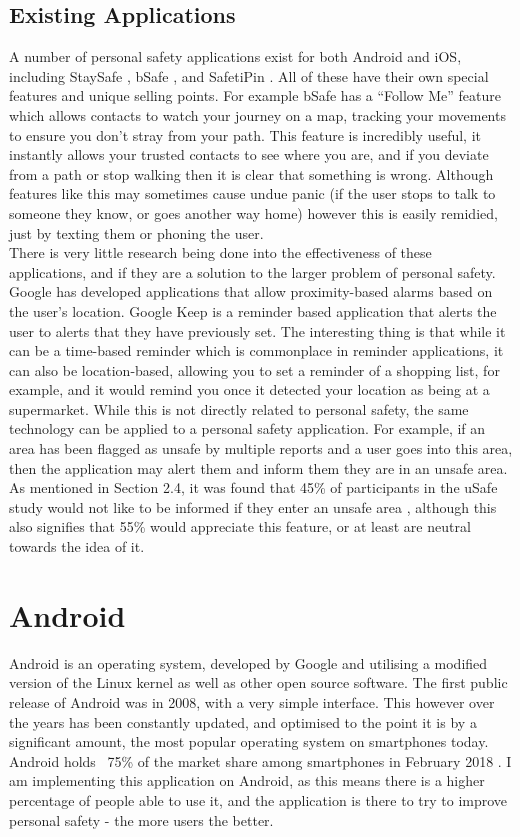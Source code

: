 \documentclass[a4paper]{report}
\begin{document}
 \subsection{Existing Applications} 
 \label{sec:ExistingApps}
 A number of personal safety applications exist for both Android and iOS, including StaySafe \cite{StaySafe}, bSafe \cite{bSafe}, and SafetiPin \cite{safetipin}. All of these have their own special features and unique selling points. For example
 bSafe has a ``Follow Me'' feature which allows contacts to watch your journey on a map, tracking your movements to ensure you don't stray from your path. This feature is incredibly useful, it instantly allows your trusted contacts to see
 where you are, and if you deviate from a path or stop walking then it is clear that something is wrong. Although features like this may sometimes cause undue panic (if the user stops to talk to someone they know, or goes another way home) however this
 is easily remidied, just by texting them or phoning the user. \\ There is very little research being done into the effectiveness of these applications, and if they are a solution to the larger problem
 of personal safety.
 \\ Google has developed applications that allow proximity-based alarms based on the user's location. Google Keep \cite{googlekeep} is a reminder based application that alerts the user to alerts that they have previously set. The interesting thing is that
 while it can be a time-based reminder which is commonplace in reminder applications, it can also be location-based, allowing you to set a reminder of a shopping list, for example, and it would remind you once it detected your location as being at a supermarket.
 While this is not directly related to personal safety, the same technology can be applied to a personal safety application. For example, if an area has been flagged as unsafe by multiple reports and a user goes into this area, then the application may alert them
 and inform them they are in an unsafe area. As mentioned in Section 2.4, it was found that 45\% of participants in the uSafe study would not like to be informed if they enter an unsafe area \cite{usafepaper}, although this also signifies that 55\% would appreciate
 this feature, or at least are neutral towards the idea of it.
\section{Android}
\label{sec:Android}
 Android is an operating system, developed by Google and utilising a modified version of the Linux kernel as well as other open source software. The first public release of Android was in 2008, with a very simple interface. This however over the years has been constantly updated, and optimised to the point it is by a significant amount, the most popular operating system on smartphones today. Android holds ~75\% of the market share among smartphones in February 2018 \cite{androidshare}. I am implementing this application on Android, as this means there is a higher percentage of people able to use it, and the application is there to try to improve personal safety - the more users the better. 
\newpage
\end{document}
